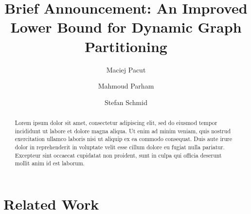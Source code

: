\documentclass[manuscript,screen=true]{acmart}
\begin{document}
\title{Brief Announcement: An Improved Lower Bound for Dynamic Graph Partitioning}


\author{Maciej Pacut}

\author{Mahmoud Parham} 

\author{Stefan Schmid} 



\newcommand{\todo}[1]{\noindent\color{brown}{todo: #1}\color{black}}


\begin{abstract}
    Lorem ipsum dolor sit amet, consectetur adipiscing elit, sed do eiusmod tempor incididunt ut labore et dolore magna aliqua. Ut enim ad minim veniam, quis nostrud exercitation ullamco laboris nisi ut aliquip ex ea commodo consequat. Duis aute irure dolor in reprehenderit in voluptate velit esse cillum dolore eu fugiat nulla pariatur. Excepteur sint occaecat cupidatat non proident, sunt in culpa qui officia deserunt mollit anim id est laborum.
\end{abstract}
    
\maketitle
    
\renewcommand{\shortauthors}{M.~Pacut, M.~Parham, S.~Schmid}

\section{Related Work}
\end{document}
